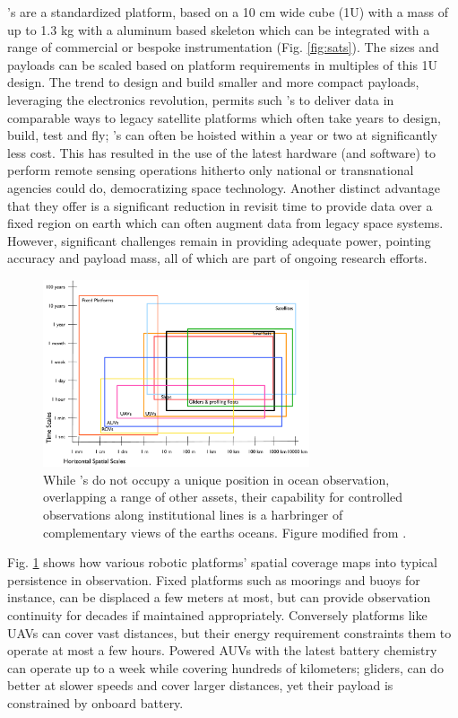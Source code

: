 \smle's are a standardized platform, based on a 10 cm wide cube (1U)
with a mass of up to 1.3 kg with a aluminum based skeleton which can
be integrated with a range of commercial or bespoke instrumentation
(Fig. \ref{fig:sats}). The sizes and payloads can be scaled based on
platform requirements in multiples of this 1U design. The trend to
design and build smaller and more compact payloads, leveraging the
electronics revolution, permits such \smle's to deliver data in
comparable ways to legacy satellite platforms which often take years
to design, build, test and fly; \smle's can often be hoisted within a
year or two at significantly less cost. This has resulted in the use
of the latest hardware (and software) to perform remote sensing
operations hitherto only national or transnational agencies could do,
democratizing space technology. Another distinct advantage that they
offer is a significant reduction in revisit time to provide data over
a fixed region on earth which can often augment data from legacy space
systems. However, significant challenges remain in providing adequate
power, pointing accuracy and payload mass, all of which are part of
ongoing research efforts.

\begin{figure}[!t]
  \centering
  \includegraphics[width=0.7\textwidth]{fig/platform-capabilities.pdf}
  \caption{While \smle's do not occupy a unique position in ocean
    observation, overlapping a range of other assets, their capability
    for controlled observations along institutional lines is a
    harbringer of complementary views of the earths oceans. Figure
    modified from \cite{haury78}.}
  \label{fig:platforms}
\end{figure}

Fig. \ref{fig:platforms} shows how various robotic platforms' spatial
coverage maps into typical persistence in observation. Fixed platforms
such as moorings and buoys for instance, can be displaced a few meters
at most, but can provide observation continuity for decades if
maintained appropriately. Conversely platforms like UAVs can cover
vast distances, but their energy requirement constraints them to
operate at most a few hours. Powered AUVs with the latest battery
chemistry can operate up to a week while covering hundreds of
kilometers; gliders, can do better at slower speeds and cover larger
distances, yet their payload is constrained by onboard battery. 


